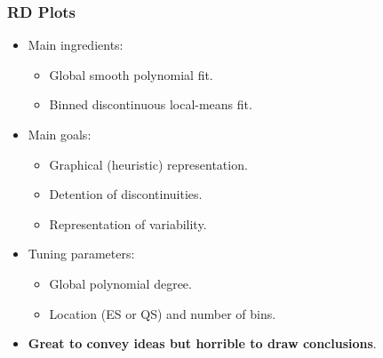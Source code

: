 \documentclass[9pt]{beamer}
\begin{document}
\begin{frame}\frametitle{RD Plots}
	\begin{itemize}
		\item Main ingredients:\medskip
		\begin{itemize}
			\item Global smooth polynomial fit.\medskip
			\item Binned discontinuous local-means fit.\bigskip
		\end{itemize}
		
		\item Main goals:\medskip
		\begin{itemize}
			\item Graphical (heuristic) representation.\medskip
			\item Detention of discontinuities.\medskip
			\item Representation of variability.\bigskip
		\end{itemize}
		
		\item Tuning parameters:\medskip
		\begin{itemize}
			\item Global polynomial degree.\medskip
			\item Location (ES or QS) and number of bins.\bigskip
		\end{itemize}
		
		\item \textbf{Great to convey ideas but horrible to draw conclusions}.
	\end{itemize}
\end{frame}
\end{document}
